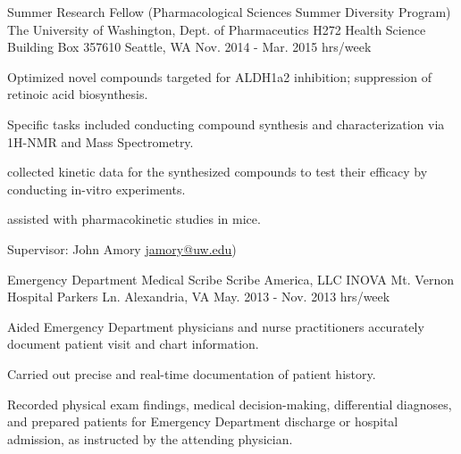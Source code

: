 \begin{cventries}
  \cventry
    {
Summer Research Fellow (Pharmacological Sciences Summer Diversity Program) }%
    {The University of Washington, Dept. of Pharmaceutics  } %
    {H272 Health Science Building \newline
Box 357610 \newline
Seattle, WA
} %
    {Nov. 2014 - Mar. 2015  hrs/week} %
    {
      \begin{cvitems} %
        \item {Optimized novel compounds targeted for ALDH1a2 inhibition; suppression of retinoic acid biosynthesis.}
        \item{Specific tasks included conducting compound synthesis and characterization via 1H-NMR and Mass Spectrometry.}
        \item{collected kinetic data for the synthesized compounds to test their efficacy by conducting in-vitro experiments.}
        \item{assisted with pharmacokinetic studies in mice.}
         \item{Supervisor: John Amory
        {\underline{\href{mailto:jamory@uw.edu}{jamory@uw.edu}}})}
      \end{cvitems}
    }


  \cventry
    {Emergency Department Medical Scribe} %
    {Scribe America, LLC } %
    {INOVA Mt. Vernon Hospital  Parkers Ln. \newline
Alexandria, VA
} %
    {May. 2013 - Nov. 2013   hrs/week} %
    {
      \begin{cvitems} %
        \item {Aided Emergency Department physicians and nurse practitioners accurately document patient visit and chart information.}
        \item{Carried out precise and real-time documentation of patient history.}
        \item{Recorded physical exam findings, medical decision-making, differential diagnoses, and prepared patients for Emergency Department discharge or hospital admission, as instructed by the attending physician.}
      \end{cvitems}
    }


\end{cventries}
